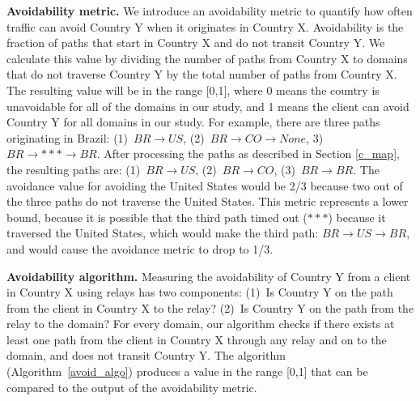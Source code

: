 \textbf{Avoidability metric.}  We introduce an avoidability metric to
quantify how often
traffic can avoid Country Y when it originates in Country X.
Avoidability is the fraction of paths that start in Country
X and do not transit Country Y.  We calculate this value by dividing the
number of paths from Country X to domains that do not traverse Country Y
by the total number of paths from Country X. The resulting value will be
in the range [0,1], where 0 means the country is unavoidable for all of
the domains in our study, and 1 means the client can avoid Country Y for
all domains in our study.  For example, there are three paths
originating in Brazil: (1)~$BR \rightarrow US$, (2)~$BR \rightarrow CO
\rightarrow None$, 3) $BR \rightarrow *** \rightarrow BR$.  After
processing the paths as described in Section \ref{c_map}, the resulting
paths are: (1)~$BR \rightarrow US$, (2)~$BR \rightarrow CO$, (3)~$BR
\rightarrow BR$.  The avoidance value for avoiding the United States
would be 2/3 because two out of the three paths do not traverse the
United States.  This metric represents a lower bound,
because it is possible that the third path timed out ($***$) because it
traversed the United States, which would make the third path: $BR
\rightarrow US \rightarrow BR$, and would cause the avoidance metric to
drop to 1/3.


\textbf{Avoidability algorithm.}  Measuring the avoidability of Country Y from a client in Country X using relays has two components: (1)~Is Country Y on the path from the client in Country X to the relay?  (2)~Is Country Y on the path from the relay to the domain?  For every domain, our algorithm checks if there exists at least one path from the client in Country X through any relay and on to the domain, and does not transit Country Y.  
The algorithm (Algorithm~\ref{avoid_algo}) produces a value in the range
[0,1] that can be compared to the output of the avoidability metric.

